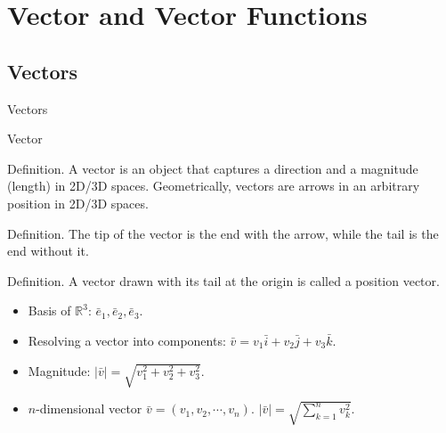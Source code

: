 \documentclass[aspectratio=169, UTF8]{ctexbeamer}
\begin{document}
\section{Vector and Vector Functions}

    \subsection{Vectors} 

    \begin{frame}[t]{Vectors}
        \begin{block}{Vector}
            \par \textcolor{yy}{Definition.} A \textcolor{yy}{vector} is an object that captures a direction and a magnitude (length) in 2D/3D spaces. Geometrically, vectors are arrows in an arbitrary position in 2D/3D spaces.

            \par \textcolor{yy}{Definition.} The \textcolor{yy}{tip} of the vector is the end with the arrow, while the \textcolor{yy}{tail} is the end without it.

            \par \textcolor{yy}{Definition.} A vector drawn with its tail at the origin is called a \textcolor{yy}{position vector}.
        \end{block}

        \begin{itemize}
            \item Basis of $\mathbb{R}^3$: $\bar{e}_1,\bar{e}_2,\bar{e}_3$.
            \item Resolving a vector into components: $\bar{v} = v_1 \bar{i} + v_2 \bar{j} + v_3 \bar{k}$.
            \item Magnitude: $\left| \bar{v} \right| = \sqrt{v_1^2 + v_2^2 + v_3^2}$.
            \item $n$-dimensional vector $\bar{v} = (v_1,v_2,\cdots,v_n)$. $\left| \bar{v} \right| = \sqrt{\sum\limits_{k=1}^{n}v_k^2}$.
        \end{itemize}
    \end{frame}
\end{document}
